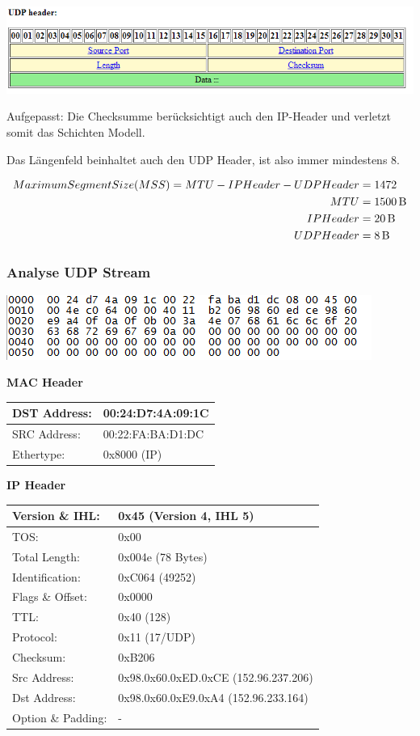 \includegraphics[width=\textwidth]{media/UDPHeader.png}

Aufgepasst: Die Checksumme berücksichtigt auch den IP-Header und verletzt somit
das Schichten Modell.

Das Längenfeld beinhaltet auch den UDP Header, ist also immer mindestens 8.

\begin{align*}
Maximum Segment Size (MSS) = MTU - IPHeader - UDP Header &= 1472\\
MTU &= \SI{1500}{\byte}\\
IPHeader &= \SI{20}{\byte}\\
UDPHeader &= \SI{8}{\byte}
\end{align*}

\subsubsection{Analyse UDP Stream}

\includegraphics[scale=1.0]{media/UDPStream.png}

\textbf{MAC Header}

\begin{tabular}[h]{|l|l|}
	\hline
	DST Address: & 00:24:D7:4A:09:1C \\
	\hline
	SRC Address: & 00:22:FA:BA:D1:DC \\
	\hline
	Ethertype: & 0x8000 (IP) \\
	\hline
\end{tabular}

\textbf{IP Header}

\begin{tabular}[h]{|l|l|}
	\hline
	Version \& IHL: & 0x45 (Version 4, IHL 5) \\
	\hline
	TOS: & 0x00 \\
	\hline
	Total Length: & 0x004e (78 Bytes) \\
	\hline
	Identification: & 0xC064 (49252) \\
	\hline
	Flags \& Offset: & 0x0000 \\
	\hline
	TTL: & 0x40 (128) \\
	\hline
	Protocol: & 0x11 (17/UDP) \\
	\hline
	Checksum: & 0xB206 \\
	\hline
	Src Address: & 0x98.0x60.0xED.0xCE (152.96.237.206) \\
	\hline
	Dst Address: & 0x98.0x60.0xE9.0xA4 (152.96.233.164) \\
	\hline
	Option \& Padding: & - \\
	\hline
\end{tabular}

